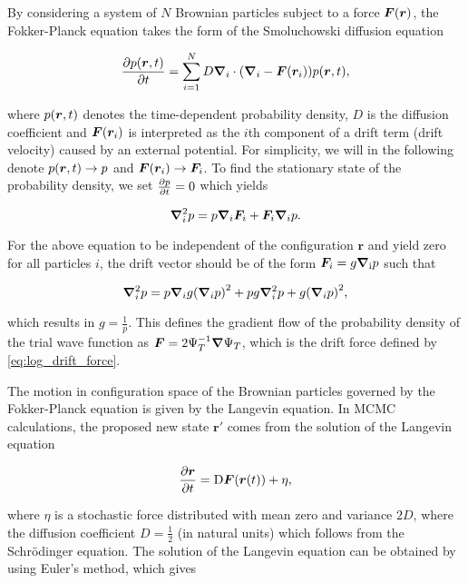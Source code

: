 By considering a system of $N$ Brownian particles subject to a force $\bm{F}\qty(\bm{r})$, the Fokker-Planck equation takes the form of the Smoluchowski diffusion equation

\begin{equation}
    \pdv{p \qty(\bm{r}, t)}{t} = \sum_{i=1}^N D \grad_i \cdot \qty(\grad_i - \bm{F}\qty(\bm{r}_i)) p \qty(\bm{r}, t),
\end{equation}

where $p \qty(\bm{r}, t)$ denotes the time-dependent probability density, $D$ is the diffusion coefficient and $\bm{F} \qty(\bm{r}_i)$ is interpreted as the $i$th component of a drift term (drift velocity) caused by an external potential. For simplicity, we will in the following denote $p \qty(\bm{r}, t) \to p$ and $\bm{F}\qty(\bm{r}_i) \to \bm{F}_i$. To find the stationary state of the probability density, we set $\pdv{p}{t} = 0$ which yields

\begin{equation*}
    \grad_i^2 p = p \grad_i \bm{F}_i + \bm{F}_i \grad_i p. 
\end{equation*}

For the above equation to be independent of the configuration $\bm{r}$ and yield zero for all particles $i$, the drift vector should be of the form  $\bm{F}_i = g\grad_{\mathrm{i}}p$ such that 

\begin{equation*}
    \grad_i^2 p = p \grad_{i} g \qty(\grad_i p)^2 + p g \grad_i^2 p + g \qty(\grad_i p)^2,
\end{equation*}

which results in $g=\frac{1}{p}$. This defines the gradient flow of the probability density of the trial wave function as $\bm{F} = 2 \Psi_T^{-1} \grad \Psi_T$, which is the drift force defined by \autoref{eq:log_drift_force}. 

The motion in configuration space of the Brownian particles governed by the Fokker-Planck equation is given by the Langevin equation. In MCMC calculations, the proposed new state $\bm{r'}$ comes from the solution of the Langevin equation 

\begin{equation}\label{eq:langevin}
    \pdv{\bm{r}}{t} = \mathrm{D}\bm{F}\qty(\bm{r}(t)) + \eta, 
\end{equation}

where $\eta$ is a stochastic force distributed with mean zero and variance $2D$, where the diffusion coefficient $D = \frac{1}{2}$ (in natural units) which follows from the Schrödinger equation. The solution of the Langevin equation can be obtained by using Euler's method, which gives

